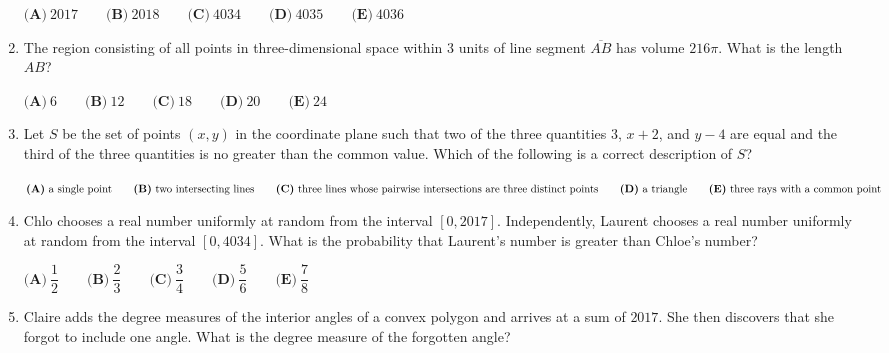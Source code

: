 \documentclass{article}
\begin{document}
\begin{enumerate}[label=\arabic*., itemsep=0.5em]
$ \textbf{(A)}\ 2017 \qquad\textbf{(B)}\ 2018 \qquad\textbf{(C)}\ 4034 \qquad\textbf{(D)}\ 4035 \qquad\textbf{(E)}\ 4036$\par \vspace{0.5em}\item The region consisting of all points in three-dimensional space within $3$ units of line segment $\overline{AB}$ has volume $216 \pi$. What is the length $AB$?

$ \textbf{(A)}\ 6 \qquad\textbf{(B)}\ 12 \qquad\textbf{(C)}\ 18 \qquad\textbf{(D)}\ 20 \qquad\textbf{(E)}\ 24$\par \vspace{0.5em}\item Let $S$ be the set of points $(x,y)$ in the coordinate plane such that two of the three quantities $3$, $x+2$, and $y-4$ are equal and the third of the three quantities is no greater than the common value. Which of the following is a correct description of $S$?

$ \textbf{(A)}\ \text{a single point} \qquad\textbf{(B)}\ \text{two intersecting lines} \\ \qquad\textbf{(C)}\ \text{three lines whose pairwise intersections are three distinct points} \\ \qquad\textbf{(D)}\ \text{a triangle}\qquad\textbf{(E)}\ \text{three rays with a common point} $\par \vspace{0.5em}\item Chlo chooses a real number uniformly at random from the interval $ [ 0,2017 ]$. Independently, Laurent chooses a real number uniformly at random from the interval $[ 0 , 4034 ]$. What is the probability that Laurent's number is greater than Chloe's number?  

$ \textbf{(A)}\ \dfrac{1}{2} \qquad\textbf{(B)}\ \dfrac{2}{3} \qquad\textbf{(C)}\ \dfrac{3}{4} \qquad\textbf{(D)}\ \dfrac{5}{6} \qquad\textbf{(E)}\ \dfrac{7}{8} $\par \vspace{0.5em}\item Claire adds the degree measures of the interior angles of a convex polygon and arrives at a sum of $2017$. She then discovers that she forgot to include one angle. What is the degree measure of the forgotten angle?


\end{enumerate}
\end{document}
